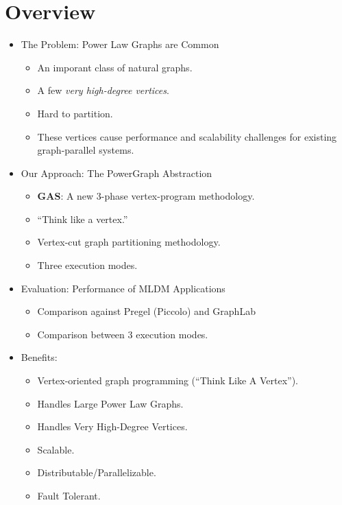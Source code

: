 \section*{Overview}

\begin{frame}
\begin{itemize}
  \item The Problem: Power Law Graphs are Common
  \begin{itemize}
    \item An imporant class of natural graphs.
    \item A few \textit{very high-degree vertices}.
    \item Hard to partition.
    \item These vertices cause performance and scalability challenges for
          existing graph-parallel systems.
  \end{itemize}

  \item Our Approach: The PowerGraph Abstraction
  \begin{itemize}
    \item \textbf{GAS}: A new 3-phase vertex-program methodology.
    \item ``Think like a vertex.'' \citep[SIGMOD '10]{malewicz2010pregel}
    \item Vertex-cut graph partitioning methodology.
    \item Three execution modes.
  \end{itemize}

  \item Evaluation: Performance of MLDM Applications
  \begin{itemize}
    \item Comparison against Pregel (Piccolo) and GraphLab
    \item Comparison between 3 execution modes.
  \end{itemize}
\end{itemize}
\end{frame}

\begin{frame}
\begin{itemize}
  \item Benefits:
  \begin{itemize}
    \item Vertex-oriented graph programming (``Think Like A Vertex'').
    \item Handles Large Power Law Graphs.
    \item Handles Very High-Degree Vertices.
    \item Scalable.
    \item Distributable/Parallelizable.
    \item Fault Tolerant.
  \end{itemize}
\end{itemize}
\end{frame}

